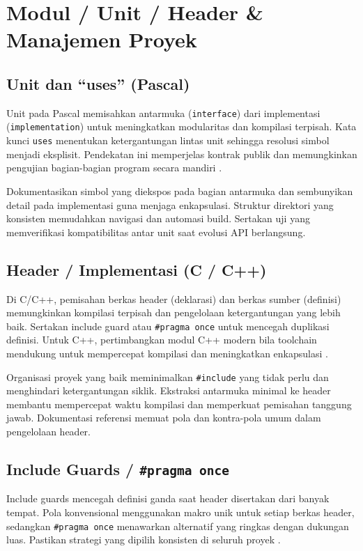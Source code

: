 \documentclass[../main.tex]{subfiles}
\begin{document}
\chapter{Modul / Unit / Header \& Manajemen Proyek}
\section{Unit dan ``uses'' (Pascal)}
Unit pada Pascal memisahkan antarmuka (\texttt{interface}) dari implementasi (\texttt{implementation}) untuk meningkatkan modularitas dan kompilasi terpisah. Kata kunci \texttt{uses} menentukan ketergantungan lintas unit sehingga resolusi simbol menjadi eksplisit. Pendekatan ini memperjelas kontrak publik dan memungkinkan pengujian bagian-bagian program secara mandiri \parencite{free-pascal-docs,pascal-tutorial-wikibooks}.

Dokumentasikan simbol yang diekspos pada bagian antarmuka dan sembunyikan detail pada implementasi guna menjaga enkapsulasi. Struktur direktori yang konsisten memudahkan navigasi dan automasi build. Sertakan uji yang memverifikasi kompatibilitas antar unit saat evolusi API berlangsung.

\section{Header / Implementasi (C / C++)}
Di C/C++, pemisahan berkas header (deklarasi) dan berkas sumber (definisi) memungkinkan kompilasi terpisah dan pengelolaan ketergantungan yang lebih baik. Sertakan include guard atau \texttt{\#pragma once} untuk mencegah duplikasi definisi. Untuk C++, pertimbangkan modul C++ modern bila toolchain mendukung untuk mempercepat kompilasi dan meningkatkan enkapsulasi \parencite{gnu-c-manual,cpp-reference}.

Organisasi proyek yang baik meminimalkan \texttt{\#include} yang tidak perlu dan menghindari ketergantungan siklik. Ekstraksi antarmuka minimal ke header membantu mempercepat waktu kompilasi dan memperkuat pemisahan tanggung jawab. Dokumentasi referensi memuat pola dan kontra-pola umum dalam pengelolaan header.

\section{Include Guards / \texttt{\#pragma once}}
Include guards mencegah definisi ganda saat header disertakan dari banyak tempat. Pola konvensional menggunakan makro unik untuk setiap berkas header, sedangkan \texttt{\#pragma once} menawarkan alternatif yang ringkas dengan dukungan luas. Pastikan strategi yang dipilih konsisten di seluruh proyek \parencite{gnu-c-manual,cpp-reference}.
\end{document}
